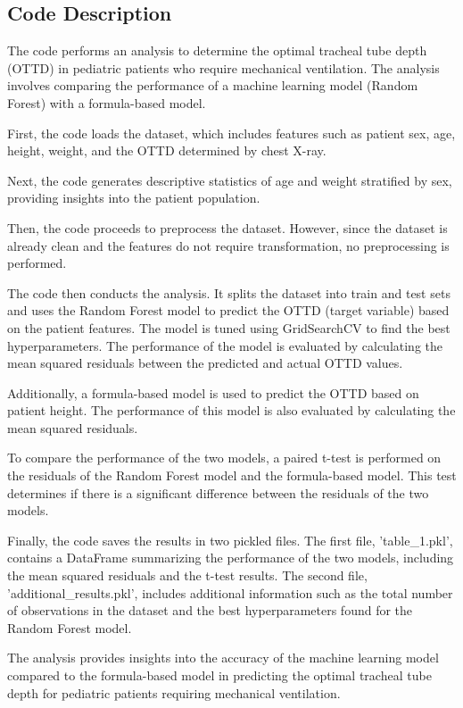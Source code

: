 \documentclass[11pt]{article}
\begin{document}
\subsection{Code Description}

The code performs an analysis to determine the optimal tracheal tube depth (OTTD) in pediatric patients who require mechanical ventilation. The analysis involves comparing the performance of a machine learning model (Random Forest) with a formula-based model.

First, the code loads the dataset, which includes features such as patient sex, age, height, weight, and the OTTD determined by chest X-ray.

Next, the code generates descriptive statistics of age and weight stratified by sex, providing insights into the patient population.

Then, the code proceeds to preprocess the dataset. However, since the dataset is already clean and the features do not require transformation, no preprocessing is performed.

The code then conducts the analysis. It splits the dataset into train and test sets and uses the Random Forest model to predict the OTTD (target variable) based on the patient features. The model is tuned using GridSearchCV to find the best hyperparameters. The performance of the model is evaluated by calculating the mean squared residuals between the predicted and actual OTTD values.

Additionally, a formula-based model is used to predict the OTTD based on patient height. The performance of this model is also evaluated by calculating the mean squared residuals.

To compare the performance of the two models, a paired t-test is performed on the residuals of the Random Forest model and the formula-based model. This test determines if there is a significant difference between the residuals of the two models.

Finally, the code saves the results in two pickled files. The first file, 'table\_1.pkl', contains a DataFrame summarizing the performance of the two models, including the mean squared residuals and the t-test results. The second file, 'additional\_results.pkl', includes additional information such as the total number of observations in the dataset and the best hyperparameters found for the Random Forest model.

The analysis provides insights into the accuracy of the machine learning model compared to the formula-based model in predicting the optimal tracheal tube depth for pediatric patients requiring mechanical ventilation.
\end{document}
